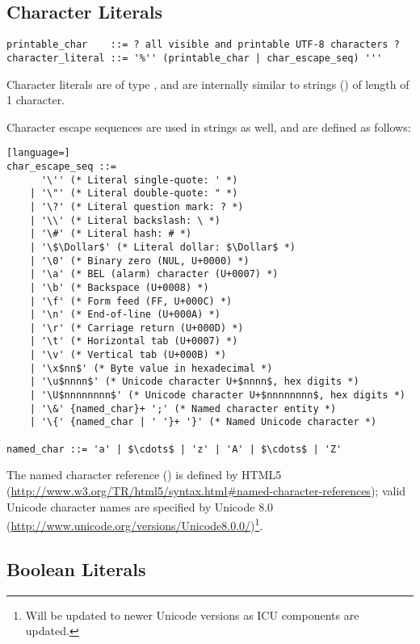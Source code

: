 \subsection{Character Literals}
\label{sec:characterliterals}

\syntax\begin{lstlisting}
printable_char    ::= ? all visible and printable UTF-8 characters ? 
character_literal ::= '%'' (printable_char | char_escape_seq) '''
\end{lstlisting}

Character literals are of type , and are internally similar to strings () of length of 1 character. 

Character escape sequences are used in strings as well, and are defined as follows: 

\syntax\begin{lstlisting}[language=]
char_escape_seq ::= 
      '\'' (* Literal single-quote: ' *)
    | '\"' (* Literal double-quote: " *)
    | '\?' (* Literal question mark: ? *)
    | '\\' (* Literal backslash: \ *)
    | '\#' (* Literal hash: # *)
    | '\$\Dollar$' (* Literal dollar: $\Dollar$ *)
    | '\0' (* Binary zero (NUL, U+0000) *)
    | '\a' (* BEL (alarm) character (U+0007) *)
    | '\b' (* Backspace (U+0008) *)
    | '\f' (* Form feed (FF, U+000C) *)
    | '\n' (* End-of-line (U+000A) *)
    | '\r' (* Carriage return (U+000D) *)
    | '\t' (* Horizontal tab (U+0007) *)
    | '\v' (* Vertical tab (U+000B) *)
    | '\x$nn$' (* Byte value in hexadecimal *)
    | '\u$nnnn$' (* Unicode character U+$nnnn$, hex digits *)
    | '\U$nnnnnnnn$' (* Unicode character U+$nnnnnnnn$, hex digits *)
    | '\&' {named_char}+ ';' (* Named character entity *)
    | '\{' {named_char | ' '}+ '}' (* Named Unicode character *)
      
named_char ::= 'a' | $\cdots$ | 'z' | 'A' | $\cdots$ | 'Z'
\end{lstlisting}

The named character reference () is defined by HTML5 (\url{http://www.w3.org/TR/html5/syntax.html#named-character-references}); valid Unicode character names are specified by Unicode 8.0 (\url{http://www.unicode.org/versions/Unicode8.0.0/})\footnote{Will be updated to newer Unicode versions as ICU components are updated.}. 





\subsection{Boolean Literals}
\label{sec:booleanliterals}

